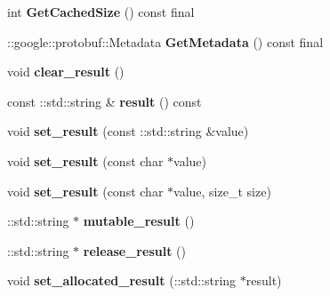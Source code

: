 \begin{DoxyCompactItemize}
\mbox{\label{classcoappbrpc_1_1api_1_1PingResponse_a2b0852c8aeb8cc3e0465ed9e9cd47290}} 
int {\bfseries Get\+Cached\+Size} () const final
\item 
\mbox{\label{classcoappbrpc_1_1api_1_1PingResponse_ac1eed7197dca329b5017e68ecea11c9f}} 
\+::google\+::protobuf\+::\+Metadata {\bfseries Get\+Metadata} () const final
\item 
\mbox{\label{classcoappbrpc_1_1api_1_1PingResponse_aab37b98fe17bce18c16dd3562fc954ff}} 
void {\bfseries clear\+\_\+result} ()
\item 
\mbox{\label{classcoappbrpc_1_1api_1_1PingResponse_ad18b5acaf8ca0cca28117262b64ce256}} 
const \+::std\+::string \& {\bfseries result} () const
\item 
\mbox{\label{classcoappbrpc_1_1api_1_1PingResponse_a74cbd8a11767aae09a25a499318b2308}} 
void {\bfseries set\+\_\+result} (const \+::std\+::string \&value)
\item 
\mbox{\label{classcoappbrpc_1_1api_1_1PingResponse_a2b2b8ed47514128e1ed0103ad1ea9757}} 
void {\bfseries set\+\_\+result} (const char $\ast$value)
\item 
\mbox{\label{classcoappbrpc_1_1api_1_1PingResponse_a8544fcc198fe60b8dd4c6d16b2d4e3ca}} 
void {\bfseries set\+\_\+result} (const char $\ast$value, size\+\_\+t size)
\item 
\mbox{\label{classcoappbrpc_1_1api_1_1PingResponse_a49642a2554e8267bde9bb9bf858ec23c}} 
\+::std\+::string $\ast$ {\bfseries mutable\+\_\+result} ()
\item 
\mbox{\label{classcoappbrpc_1_1api_1_1PingResponse_a712ccd9a79e0872330dae05410445844}} 
\+::std\+::string $\ast$ {\bfseries release\+\_\+result} ()
\item 
\mbox{\label{classcoappbrpc_1_1api_1_1PingResponse_a101f1514a4408ed87b9a4f78208e016e}} 
void {\bfseries set\+\_\+allocated\+\_\+result} (\+::std\+::string $\ast$result)
\end{DoxyCompactItemize}

